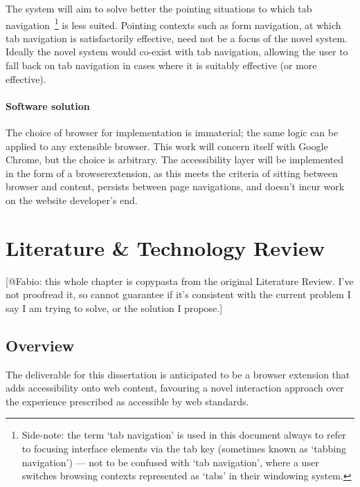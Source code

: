 \documentclass[11pt,openright,a4paper]{report}
\begin{document}
The system will aim to solve better the pointing situations to which tab navigation~\footnote{Side-note: the term `tab navigation' is used in this document always to refer to focusing interface elements via the tab key (sometimes known as `tabbing navigation') --- not to be confused with `tab navigation', where a user switches browsing contexts represented as `tabs' in their windowing system.} is less suited. Pointing contexts such as form navigation, at which tab navigation is satisfactorily effective, need not be a focus of the novel system. Ideally the novel system would co-exist with tab navigation, allowing the user to fall back on tab navigation in cases where it is suitably effective (or more effective).
\subsubsection{Software solution}
\label{sec:softwaresolution}
The choice of browser for implementation is immaterial; the same logic can be applied to any extensible browser. This work will concern itself with Google Chrome, but the choice is arbitrary.
The accessibility layer will be implemented in the form of a \gls{browserextension}, as this meets the criteria of sitting between browser and content, persists between page navigations, and doesn't incur work on the website developer's end.

\chapter{Literature \& Technology Review}
\label{chap:litreview}
[@Fabio: this whole chapter is copypasta from the original Literature Review. I've not proofread it, so cannot guarantee if it's consistent with the current problem I say I am trying to solve, or the solution I propose.]
\section{Overview}
The deliverable for this dissertation is anticipated to be a browser extension that adds accessibility onto web content, favouring a novel interaction approach over the experience prescribed as accessible by web standards.
\end{document}
